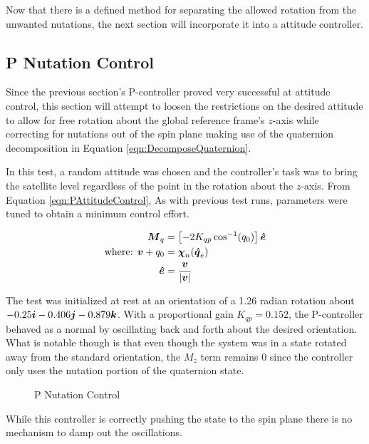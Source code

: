 Now that there is a defined method for separating the allowed rotation from the unwanted nutations, the next section will incorporate it into a attitude controller.

\subsection{P Nutation Control}
\label{subsec:PNutationControl}

Since the previous section's P-controller proved very successful at attitude control, this section will attempt to loosen the restrictions on the desired attitude to allow for free rotation about the global reference frame's $z$-axis while correcting for nutations out of the spin plane making use of the quaternion decomposition in Equation \ref{eqn:DecomposeQuaternion}.

In this test, a random attitude was chosen and the controller's task was to bring the satellite level regardless of the point in the rotation about the $z$-axis.  From Equation \ref{eqn:PAttitudeControl},    As with previous test runs, parameters were tuned to obtain a minimum control effort.

\begin{subequations}
  \begin{align}
    \boldsymbol{M}_{q} &= \left[-2 K_{qp} \cos^{-1} (q_{0}) \right] \boldsymbol{\hat{e}} \\
    \text{where: } \boldsymbol{v} + q_0 &= \boldsymbol{\chi}_n(\boldsymbol{\hat{q}}_e)\\
    \boldsymbol{\hat{e}} &= \frac{\boldsymbol{v}}{|\boldsymbol{v}|}
  \end{align}
  \label{eqn:PNutationControl}
\end{subequations}

The test was initialized at rest at an orientation of a 1.26 radian rotation about $-0.25 \boldsymbol{i} -0.406\boldsymbol{j} -0.879\boldsymbol{k}$.  With a proportional gain $K_{qp} = 0.152$, the P-controller behaved as a normal by oscillating back and forth about the desired orientation.  What is notable though is that even though the system was in a state rotated away from the standard orientation, the $M_z$ term remains 0 since the controller only uses the nutation portion of the quaternion state.

\begin{figure}[H]
  \centerline{}
  \caption{P Nutation Control}
  \label{fig:PNutationControl}
\end{figure}

While this controller is correctly pushing the state to the spin plane there is no mechanism to damp out the oscillations.

